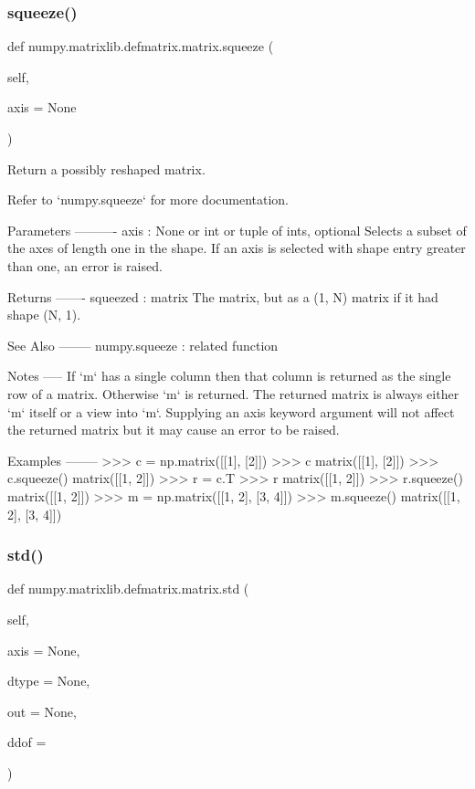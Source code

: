 \subsubsection{\texorpdfstring{squeeze()}{squeeze()}}
{\footnotesize\ttfamily def numpy.\+matrixlib.\+defmatrix.\+matrix.\+squeeze (\begin{DoxyParamCaption}\item[{}]{self,  }\item[{}]{axis = {\ttfamily None} }\end{DoxyParamCaption})}

\begin{DoxyVerb}Return a possibly reshaped matrix.

Refer to `numpy.squeeze` for more documentation.

Parameters
----------
axis : None or int or tuple of ints, optional
    Selects a subset of the axes of length one in the shape.
    If an axis is selected with shape entry greater than one,
    an error is raised.

Returns
-------
squeezed : matrix
    The matrix, but as a (1, N) matrix if it had shape (N, 1).

See Also
--------
numpy.squeeze : related function

Notes
-----
If `m` has a single column then that column is returned
as the single row of a matrix.  Otherwise `m` is returned.
The returned matrix is always either `m` itself or a view into `m`.
Supplying an axis keyword argument will not affect the returned matrix
but it may cause an error to be raised.

Examples
--------
>>> c = np.matrix([[1], [2]])
>>> c
matrix([[1],
[2]])
>>> c.squeeze()
matrix([[1, 2]])
>>> r = c.T
>>> r
matrix([[1, 2]])
>>> r.squeeze()
matrix([[1, 2]])
>>> m = np.matrix([[1, 2], [3, 4]])
>>> m.squeeze()
matrix([[1, 2],
[3, 4]])\end{DoxyVerb}
 \mbox{\label{classnumpy_1_1matrixlib_1_1defmatrix_1_1matrix_ad892947d8e70c5aaf1fee9567f6817ff}} 
\subsubsection{\texorpdfstring{std()}{std()}}
{\footnotesize\ttfamily def numpy.\+matrixlib.\+defmatrix.\+matrix.\+std (\begin{DoxyParamCaption}\item[{}]{self,  }\item[{}]{axis = {\ttfamily None},  }\item[{}]{dtype = {\ttfamily None},  }\item[{}]{out = {\ttfamily None},  }\item[{}]{ddof = {} }\end{DoxyParamCaption})}

